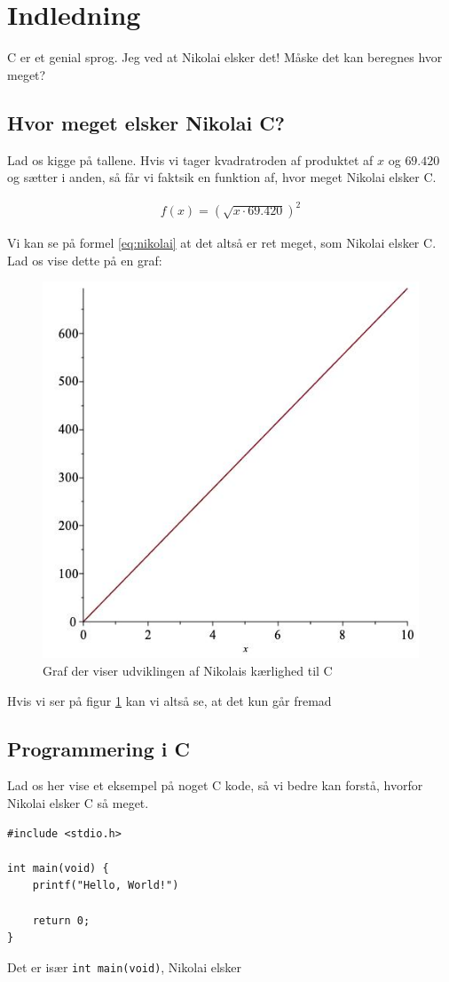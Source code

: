 \section{Indledning}
C er et genial sprog\cite{C-bog}. Jeg ved at Nikolai elsker det! Måske det kan beregnes hvor meget?

\subsection{Hvor meget elsker Nikolai C?}
Lad os kigge på tallene. Hvis vi tager kvadratroden af produktet af $x$ og $69.420$ og sætter i anden, så får vi faktsik en funktion af, hvor meget Nikolai elsker C.

\begin{gather}
    \label{eq:nikolai}
    f(x) = (\sqrt{x \cdot 69.420})^2
\end{gather}

Vi kan se på formel \ref{eq:nikolai} at det altså er ret meget, som Nikolai elsker C. Lad os vise dette på en graf:

\begin{figure}[h!]
    \centering
    \includegraphics[width=0.8\linewidth]{Figurer/Nikolai-c.jpg}
    \caption{Graf der viser udviklingen af Nikolais kærlighed til C}
    \label{fig:nikolai-c}
\end{figure}

\noindent %
Hvis vi ser på figur \ref{fig:nikolai-c} kan vi altså se, at det kun går fremad

\subsection{Programmering i C}
Lad os her vise et eksempel på noget C kode, så vi bedre kan forstå, hvorfor Nikolai elsker C så meget.

\begin{verbatim}
#include <stdio.h>

int main(void) {
    printf("Hello, World!")
    
    return 0;
}
\end{verbatim}
\noindent
Det er især \texttt{int main(void)}, Nikolai elsker